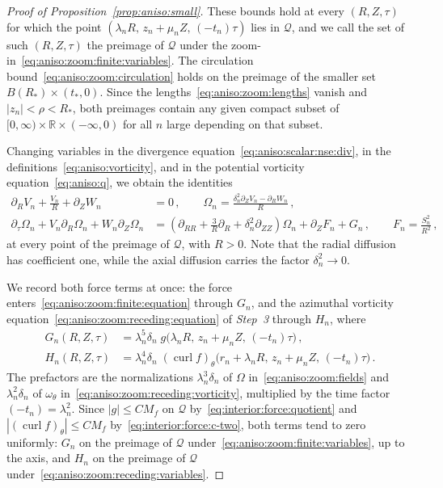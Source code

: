 \documentclass[11pt,reqno]{amsproc}
\numberwithin{equation}{section}
\theoremstyle{remark}
\newcommand{\p}{\partial}
\newcommand{\RR}{\mathbb R}
\newcommand{\curl}{\operatorname{curl}}
\begin{document}
\begin{proof}[Proof of Proposition~\ref{prop:aniso:small}]
These bounds hold at every $(R,Z,\tau)$ for which the point $(\lambda_nR,\,z_n+\mu_nZ,\,(-t_n)\tau)$ lies in $\mathcal Q$, and we call the set of such $(R,Z,\tau)$ the preimage of $\mathcal Q$ under the zoom-in~\eqref{eq:aniso:zoom:finite:variables}. The circulation bound~\eqref{eq:aniso:zoom:circulation} holds on the preimage of the smaller set $B(R_*)\times(t_*,0)$. Since the lengths~\eqref{eq:aniso:zoom:lengths} vanish and $|z_n|<\rho<R_*$, both preimages contain any given compact subset of $[0,\infty)\times\RR\times(-\infty,0)$ for all $n$ large depending on that subset.

Changing variables in the divergence equation~\eqref{eq:aniso:scalar:nse:div}, in the definitions~\eqref{eq:aniso:vorticity}, and in the potential vorticity equation~\eqref{eq:aniso:q}, we obtain the identities
\begin{subequations}
\label{eq:aniso:zoom:finite}
\begin{align}
\p_RV_n+\frac{V_n}{R}+\p_ZW_n&=0
\,,\qquad
\Omega_n=\frac{\delta_n^2\p_ZV_n-\p_RW_n}{R}
\,,
\label{eq:aniso:zoom:finite:identities}\\
\p_\tau \Omega_n+V_n\p_R\Omega_n+W_n\p_Z\Omega_n
&=\left(\p_{RR}+\frac3R\p_R+\delta_n^2\p_{ZZ}\right)\Omega_n
+\p_ZF_n+G_n
\,,\qquad F_n=\frac{S_n^2}{R^2}
\,,
\label{eq:aniso:zoom:finite:equation}
\end{align}
\end{subequations}
at every point of the preimage of $\mathcal Q$, with $R>0$.
Note that the radial diffusion has coefficient one, while the axial diffusion carries the factor $\delta_n^2\to0$.

We record both force terms at once: the force enters~\eqref{eq:aniso:zoom:finite:equation} through $G_n$, and the azimuthal vorticity equation~\eqref{eq:aniso:zoom:receding:equation} of \emph{Step~3} through $H_n$, where
\begin{subequations}
\label{eq:interior:force:scaled}
\begin{align}
G_n(R,Z,\tau)&=\lambda_n^5\delta_n\;g\bigl(\lambda_nR,\,z_n+\mu_nZ,\,(-t_n)\tau\bigr)\,,
\\
H_n(R,Z,\tau)&=\lambda_n^4\delta_n\;(\curl f)_\theta\bigl(r_n+\lambda_nR,\,z_n+\mu_nZ,\,(-t_n)\tau\bigr)
\label{eq:interior:force:scaled:b}
\,.
\end{align}
\end{subequations}
The prefactors are the normalizations $\lambda_n^3\delta_n$ of $\Omega$ in~\eqref{eq:aniso:zoom:fields} and $\lambda_n^2\delta_n$ of $\omega_\theta$ in~\eqref{eq:aniso:zoom:receding:vorticity}, multiplied by the time factor $(-t_n)=\lambda_n^2$. Since $|g|\le CM_f$ on $\mathcal Q$ by~\eqref{eq:interior:force:quotient} and $|(\curl f)_\theta|\le CM_f$ by~\eqref{eq:interior:force:c-two}, both terms tend to zero uniformly: $G_n$ on the preimage of $\mathcal Q$ under~\eqref{eq:aniso:zoom:finite:variables}, up to the axis, and $H_n$ on the preimage of $\mathcal Q$ under~\eqref{eq:aniso:zoom:receding:variables}.


\end{proof}
\end{document}

